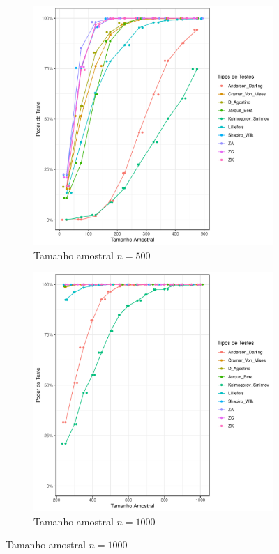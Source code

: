 \documentclass[a4paper,11pt]{article} %
\begin{document}
\begin{figure}[H]
    \vspace{0.5cm} %
    \begin{subfigure}[b]{0.45\textwidth}
        \centering
        \includegraphics[width=\textwidth]{Distribuição Beta/Poder do Teste/poder_teste_beta_500.pdf}
        \caption{Tamanho amostral \(n = 500\)}
        \label{fig:beta_poder_500}
    \end{subfigure}
    \hfill
    \begin{subfigure}[b]{0.45\textwidth}
        \centering
        \includegraphics[width=\textwidth]{Distribuição Beta/Poder do Teste/poder_teste_beta_1000.pdf}
        \caption{Tamanho amostral \(n = 1000\)}
        \label{fig:beta_poder_1000}
    \end{subfigure}
\end{figure}
\end{document}
